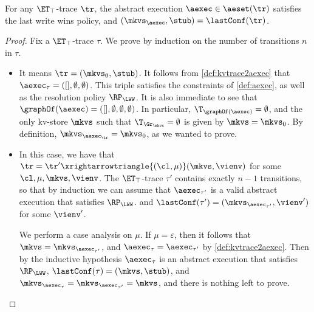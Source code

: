 \begin{proposition}
\label{prop:kvtrace2aexec}
For any $\ET_{\top}$-trace $\tr$, 
the abstract execution $\aexec \in \aeset(\tr)$ satisfies the last write wins policy,
and $(\mkvs_{\aexec}, \stub) = \lastConf(\tr)$.
\end{proposition}
\begin{proof}
Fix a $\ET_{\top}$-trace $\tau$. 
We prove by induction on the number of transitions $n$ in $\tau$. 
\begin{itemize}
\item {}
It means $\tr = (\mkvs_{0}, \stub)$.
It follows from \cref{def:kvtrace2aexec} that $\aexec_{\tau} = ([], \emptyset, \emptyset)$. 
This triple satisfies the constraints of \cref{def:aexec}, as well as the resolution policy $\RP_{\LWW}$. 
It is also immediate to see that $\graphOf(\aexec) = ([], \emptyset, \emptyset, \emptyset)$.
In particular, $\T_{\graphOf(\aexec)} = \emptyset$, 
and the only kv-store $\mkvs$ such that $\T_{\Gr_{\mkvs}} = \emptyset$ 
is given by $\mkvs = \mkvs_{0}$. 
By definition, $\mkvs_{\aexec_{\tr}} = \mkvs_{0}$, as we wanted to prove.

\item {} In this case, we have that $\tr = \tr' \xrightarrowtriangle{(\cl, \mu)} (\mkvs, \vienv)$ 
for some $\cl, \mu, \mkvs, \vienv$. The $\ET_{\top}$-trace $\tau'$ contains exactly $n-1$ transitions, 
so that by induction we can assume that $\aexec_{\tau'}$ is a valid abstract execution that satisfies 
$\RP_{\LWW}$. and $\lastConf(\tau') = (\mkvs_{\aexec_{\tau'}}, \vienv')$ for some $\vienv'$. 

We perform a case analysis on $\mu$. 
If $\mu = \varepsilon$, then it follows that $\mkvs = \mkvs_{\aexec_{\tau'}}$, 
and $\aexec_{\tau} = \aexec_{\tau'}$ by \cref{def:kvtrace2aexec}. 
Then by the inductive hypothesis $\aexec_{\tau}$ is an abstract execution that satisfies $\RP_{\LWW}$,
$\lastConf(\tau) = (\mkvs, \stub)$, and $\mkvs_{\aexec_{\tau}} = \mkvs_{\aexec_{\tau'}} = \mkvs$, 
and there is nothing left to prove. 


\end{itemize}
\end{proof}

